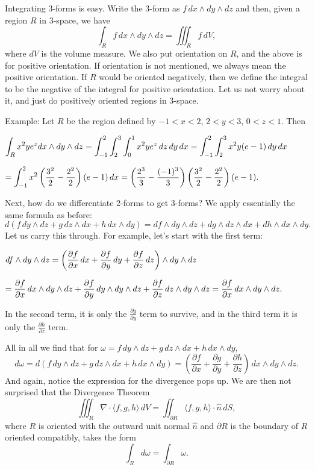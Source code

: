 \documentclass[12pt]{article}
\begin{document}
Integrating 3-forms is easy.  Write the 3-form as $f \, dx \wedge dy \wedge
dz$ and then, given a region $R$ in 3-space, we have
$$
\int_R f \, dx \wedge dy \wedge dz
=
\iiint_R f\, dV ,
$$
where $dV$ is the volume measure.  We also put orientation on $R$, and
the above is for positive orientation.  If orientation is not mentioned, we
always mean the positive orientation.  If $R$ would be
oriented negatively, then we define the integral
to be the negative of the integral for positive orientation.
Let us not worry about it, and just do positively oriented
regions in 3-space.

Example:  Let $R$ be the region defined by $-1 < x < 2$, $2 < y < 3$, $0<z<1$.
Then

$
\displaystyle
\int_R x^2 y e^z dx \wedge dy \wedge dz
=
\int_{-1}^2 \int_2^3 \int_0^1 
x^2 y e^z \, dz \, dy \, dx
=
\int_{-1}^2 \int_2^3 
x^2 y (e-1) \, dy \, dx
\hfill
$

$\displaystyle
\hfill
=
\int_{-1}^2
x^2 \left(\frac{3^2}{2} - \frac{2^2}{2}\right) (e-1) \, dx
=
\left( \frac{2^3}{3} - \frac{(-1)^3}{3} \right) \left(\frac{3^2}{2} -
\frac{2^2}{2}\right) (e-1) .
$



Next, how do we differentiate 2-forms to get 3-forms?  We apply essentially
the same formula as before:
$$
d(
f\, dy \wedge dz + 
g\, dz \wedge dx +
h\, dx \wedge dy
)
=
df \wedge dy \wedge dz + 
dg \wedge dz \wedge dx +
dh \wedge dx \wedge dy .
$$
Let us carry this through.  For example, let's start with the first
term:

$
\displaystyle
df \wedge dy \wedge dz 
=
\left(
\frac{\partial f}{\partial x} \, dx +
\frac{\partial f}{\partial y} \, dy +
\frac{\partial f}{\partial z} \, dz 
\right)
\wedge dy \wedge dz 
\hfill
$

$
\displaystyle
\hfill
=
\frac{\partial f}{\partial x} \, dx 
\wedge dy \wedge dz +
\frac{\partial f}{\partial y} \, dy 
\wedge dy \wedge dz +
\frac{\partial f}{\partial z} \, dz 
\wedge dy \wedge dz 
=
\frac{\partial f}{\partial x} \, dx \wedge dy \wedge dz .
$

In the second term, it is only the $\frac{\partial g}{\partial y}$ term to
survive, and in the third term it is only the
$\frac{\partial h}{\partial z}$ term.

All in all we find
that for
$\omega = f\, dy \wedge dz + 
g\, dz \wedge dx +
h\, dx \wedge dy$,
$$
d\omega =
d(
f\, dy \wedge dz + 
g\, dz \wedge dx +
h\, dx \wedge dy
)
=
\left(\frac{\partial f}{\partial x} +
\frac{\partial g}{\partial y} +
\frac{\partial h}{\partial z} \right) \, dx \wedge dy \wedge dz .
$$
And again, notice the expression for the divergence pops up.
We are then not surprised that the Divergence Theorem
$$
\iiint_R \nabla \cdot \langle f,g,h \rangle \, dV = \iint_{\partial R}
\langle f,g,h \rangle \cdot
\hat{n} \, dS,
$$
where $R$ is oriented with the outward unit normal $\hat{n}$
and
$\partial R$ is the boundary of $R$ oriented compatibly,
takes the form
$$
\int_R d \omega = \int_{\partial R} \omega .
$$
\end{document}
